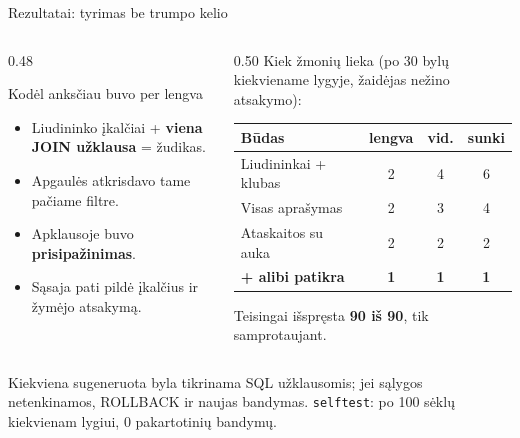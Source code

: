 \documentclass[hyperref={breaklinks=true},fleqn,mathserif]{beamer}
\begin{document}
\begin{frame}{Rezultatai: tyrimas be trumpo kelio}

\begin{columns}[T]
\begin{column}{0.48\textwidth}
\begin{block}{Kodėl anksčiau buvo per lengva}
\footnotesize
\begin{itemize}
    \setlength{\itemsep}{1pt}
    \item Liudininko įkalčiai + \textbf{viena JOIN užklausa} = žudikas.
    \item Apgaulės atkrisdavo tame pačiame filtre.
    \item Apklausoje buvo \textbf{prisipažinimas}.
    \item Sąsaja pati pildė įkalčius ir žymėjo atsakymą.
\end{itemize}
\end{block}
\end{column}

\begin{column}{0.50\textwidth}
\footnotesize
Kiek žmonių lieka (po 30 bylų kiekviename lygyje, žaidėjas nežino atsakymo):
\par\smallskip
\scriptsize
\setlength{\tabcolsep}{4pt}
\begin{tabular}{@{}lccc@{}}
\toprule
Būdas & lengva & vid. & sunki \\
\midrule
Liudininkai + klubas & 2 & 4 & 6 \\
Visas aprašymas & 2 & 3 & 4 \\
Ataskaitos su auka & 2 & 2 & 2 \\
\textbf{+ alibi patikra} & \textbf{1} & \textbf{1} & \textbf{1} \\
\bottomrule
\end{tabular}
\par\smallskip
\footnotesize Teisingai išspręsta \textbf{90 iš 90}, tik samprotaujant.
\end{column}
\end{columns}

\vspace{3mm}
{\footnotesize Kiekviena sugeneruota byla tikrinama SQL užklausomis; jei sąlygos netenkinamos,
ROLLBACK ir naujas bandymas. \texttt{selftest}: po 100 sėklų kiekvienam lygiui, 0 pakartotinių bandymų.}

\end{frame}
\end{document}
